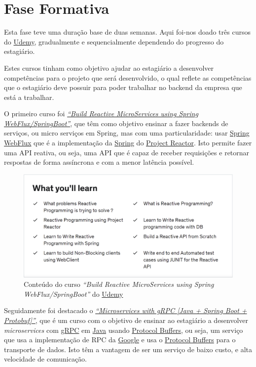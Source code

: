 \section{Fase Formativa}

Esta fase teve uma duração base de duas semanas. Aqui foi-nos doado três cursos do \href{https://www.udemy.com/}{Udemy}, gradualmente e sequencialmente dependendo do progresso do estagiário.

Estes cursos tinham como objetivo ajudar ao estagiário a desenvolver competências para o projeto que será desenvolvido, o qual reflete as competências que o estagiário deve possuir para poder trabalhar no backend da empresa que está a trabalhar.

O primeiro curso foi \href{https://www.udemy.com/course/build-reactive-restful-apis-using-spring-boot-webflux/}{\textit{``Build Reactive MicroServices using Spring WebFlux/SpringBoot''}}, que têm como objetivo ensinar a fazer backends de serviços, ou micro serviços em Spring, mas com uma particularidade: usar \href{https://spring.io/reactive}{Spring WebFlux} que é a implementação da \href{https://spring.io/}{Spring} do \href{https://projectreactor.io/}{Project Reactor}. Isto permite fazer uma API reativa, ou seja, uma API que é capaz de receber requisições e retornar respostas de forma assíncrona e com a menor latência possível.

\begin{figure}[!hbt]
  \centering
  \includegraphics[width=14cm]{figuras/udemy1.png}
  \caption{Conteúdo do curso \textit{``Build Reactive MicroServices using Spring WebFlux/SpringBoot''} do \href{https://www.udemy.com/}{Udemy}}
  \label{fig:udemy1}
\end{figure}
\FloatBarrier

Seguidamente foi destacado o \href{https://www.udemy.com/course/grpc-the-complete-guide-for-java-developers/}{\textit{``Microservices with gRPC [Java + Spring Boot + Protobuf]''}}, que é um curso com o objetivo de ensinar ao estagiário a desenvolver \textit{microservices} com \href{https://grpc.io/}{gRPC} em \href{https://jdk.java.net/}{Java} usando \href{https://developers.google.com/protocol-buffers}{Protocol Buffers}, ou seja, um serviço que usa a implementação de RPC da \href{https://abc.xyz/}{Google} e usa o \href{https://developers.google.com/protocol-buffers}{Protocol Buffers} para o transporte de dados. Isto têm a vantagem de ser um serviço de baixo custo, e alta velocidade de comunicação.


